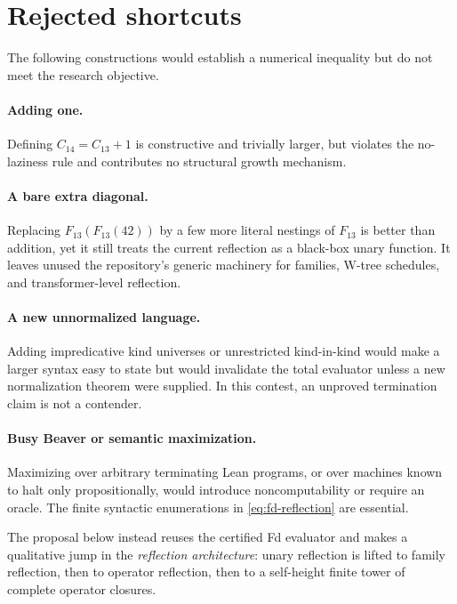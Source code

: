 \documentclass[11pt]{article}
\theoremstyle{definition}
\theoremstyle{remark}
\begin{document}
\section{Rejected shortcuts}

The following constructions would establish a numerical inequality but do not
meet the research objective.

\paragraph{Adding one.}
Defining $C_{14}=C_{13}+1$ is constructive and trivially larger, but violates
the no-laziness rule and contributes no structural growth mechanism.

\paragraph{A bare extra diagonal.}
Replacing $F_{13}(F_{13}(42))$ by a few more literal nestings of $F_{13}$ is
better than addition, yet it still treats the current reflection as a black-box
unary function.  It leaves unused the repository's generic machinery for
families, W-tree schedules, and transformer-level reflection.

\paragraph{A new unnormalized language.}
Adding impredicative kind universes or unrestricted kind-in-kind would make a
larger syntax easy to state but would invalidate the total evaluator unless a
new normalization theorem were supplied.  In this contest, an unproved
termination claim is not a contender.

\paragraph{Busy Beaver or semantic maximization.}
Maximizing over arbitrary terminating Lean programs, or over machines known to
halt only propositionally, would introduce noncomputability or require an
oracle.  The finite syntactic enumerations in \eqref{eq:fd-reflection} are
essential.

The proposal below instead reuses the certified Fd evaluator and makes a
qualitative jump in the \emph{reflection architecture}: unary reflection is
lifted to family reflection, then to operator reflection, then to a self-height
finite tower of complete operator closures.
\end{document}
